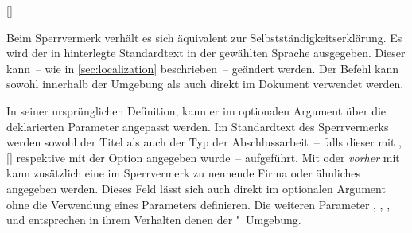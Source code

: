 \begin{Declaration*}{}
\begin{Declaration*}{}
\begin{Declaration*}{}
\begin{Declaration}[v2.02]{[]}
\begin{Declaration}{}
\begin{Declaration}{}
\begin{Declaration}{}
\begin{Declaration}{}
\begin{Declaration}{}
\begin{Declaration}{}
\printdeclarationlist%
%
Beim Sperrvermerk verhält es sich äquivalent zur Selbstständigkeitserklärung.
Es wird der in  hinterlegte Standardtext in der gewählten 
Sprache ausgegeben. Dieser kann~-- wie in \autoref{sec:localization} 
beschrieben~-- geändert werden. Der Befehl  kann sowohl 
innerhalb der Umgebung  als auch direkt im Dokument 
verwendet werden. 

In seiner ursprünglichen Definition, kann er im optionalen Argument über die 
deklarierten Parameter angepasst werden. Im Standardtext des Sperrvermerks 
werden sowohl der Titel als auch der Typ der Abschlussarbeit~-- falls dieser 
mit , []
respektive mit der Option  angegeben wurde~-- aufgeführt. 
Mit  oder \emph{vorher} mit  kann 
zusätzlich eine im Sperrvermerk zu nennende Firma oder ähnliches angegeben 
werden. Dieses Feld lässt sich auch direkt im optionalen Argument ohne die 
Verwendung eines Parameters definieren. Die weiteren Parameter 
, 
, 
, 
 und 
 entsprechen in ihrem Verhalten denen 
der "~Umgebung.
\end{Declaration}
\end{Declaration}
\end{Declaration}
\end{Declaration}
\end{Declaration}
\end{Declaration}
\end{Declaration}


\end{Declaration*}
\end{Declaration*}
\end{Declaration*}

